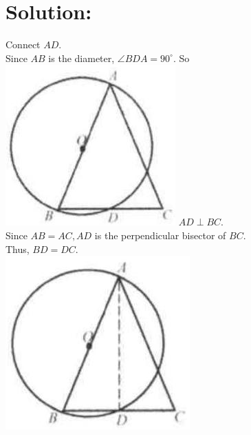 \documentclass[10pt]{article}
\begin{document}
\section*{Solution:}
Connect \(A D\).\\
Since \(A B\) is the diameter, \(\angle B D A=90^{\circ}\). So\\
\includegraphics[max width=\textwidth]{2025_04_17_97bc1f7e44d93c271a88g-163} \(A D \perp B C\).\\
Since \(A B=A C, A D\) is the perpendicular bisector of \(B C\).\\
Thus, \(B D=D C\).\\
\includegraphics[max width=\textwidth, center]{2025_04_17_97bc1f7e44d93c271a88g-163(1)}
\end{document}
